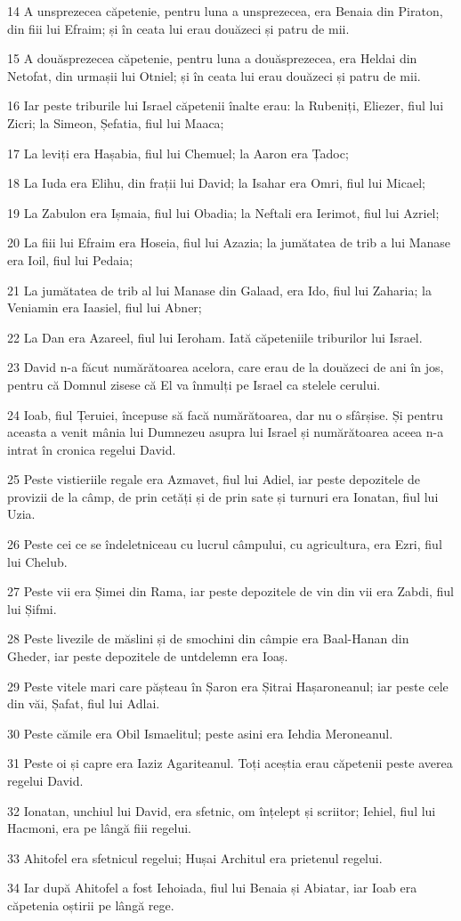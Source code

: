\par 14 A unsprezecea căpetenie, pentru luna a unsprezecea, era Benaia din Piraton, din fiii lui Efraim; și în ceata lui erau douăzeci și patru de mii.
\par 15 A douăsprezecea căpetenie, pentru luna a douăsprezecea, era Heldai din Netofat, din urmașii lui Otniel; și în ceata lui erau douăzeci și patru de mii.
\par 16 Iar peste triburile lui Israel căpetenii înalte erau: la Rubeniți, Eliezer, fiul lui Zicri; la Simeon, Șefatia, fiul lui Maaca;
\par 17 La leviți era Hașabia, fiul lui Chemuel; la Aaron era Țadoc;
\par 18 La Iuda era Elihu, din frații lui David; la Isahar era Omri, fiul lui Micael;
\par 19 La Zabulon era Ișmaia, fiul lui Obadia; la Neftali era Ierimot, fiul lui Azriel;
\par 20 La fiii lui Efraim era Hoseia, fiul lui Azazia; la jumătatea de trib a lui Manase era Ioil, fiul lui Pedaia;
\par 21 La jumătatea de trib al lui Manase din Galaad, era Ido, fiul lui Zaharia; la Veniamin era Iaasiel, fiul lui Abner;
\par 22 La Dan era Azareel, fiul lui Ieroham. Iată căpeteniile triburilor lui Israel.
\par 23 David n-a făcut numărătoarea acelora, care erau de la douăzeci de ani în jos, pentru că Domnul zisese că El va înmulți pe Israel ca stelele cerului.
\par 24 Ioab, fiul Țeruiei, începuse să facă numărătoarea, dar nu o sfârșise. Și pentru aceasta a venit mânia lui Dumnezeu asupra lui Israel și numărătoarea aceea n-a intrat în cronica regelui David.
\par 25 Peste vistieriile regale era Azmavet, fiul lui Adiel, iar peste depozitele de provizii de la câmp, de prin cetăți și de prin sate și turnuri era Ionatan, fiul lui Uzia.
\par 26 Peste cei ce se îndeletniceau cu lucrul câmpului, cu agricultura, era Ezri, fiul lui Chelub.
\par 27 Peste vii era Șimei din Rama, iar peste depozitele de vin din vii era Zabdi, fiul lui Șifmi.
\par 28 Peste livezile de măslini și de smochini din câmpie era Baal-Hanan din Gheder, iar peste depozitele de untdelemn era Ioaș.
\par 29 Peste vitele mari care pășteau în Șaron era Șitrai Hașaroneanul; iar peste cele din văi, Șafat, fiul lui Adlai.
\par 30 Peste cămile era Obil Ismaelitul; peste asini era Iehdia Meroneanul.
\par 31 Peste oi și capre era Iaziz Agariteanul. Toți aceștia erau căpetenii peste averea regelui David.
\par 32 Ionatan, unchiul lui David, era sfetnic, om înțelept și scriitor; Iehiel, fiul lui Hacmoni, era pe lângă fiii regelui.
\par 33 Ahitofel era sfetnicul regelui; Hușai Architul era prietenul regelui.
\par 34 Iar după Ahitofel a fost Iehoiada, fiul lui Benaia și Abiatar, iar Ioab era căpetenia oștirii pe lângă rege.

